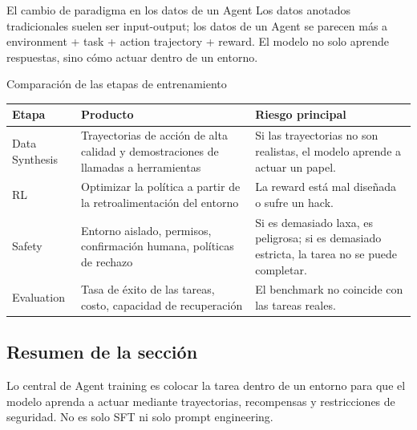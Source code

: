 \begin{importantbox}{El cambio de paradigma en los datos de un Agent}
Los datos anotados tradicionales suelen ser input-output; los datos de un Agent se parecen más a environment + task + action trajectory + reward. El modelo no solo aprende respuestas, sino cómo actuar dentro de un entorno.
\end{importantbox}

\begin{knowledgebox}{Comparación de las etapas de entrenamiento}
\begin{tabularx}{\textwidth}{p{}p{}X}
\toprule
Etapa & Producto & Riesgo principal \\
\midrule
Data Synthesis & Trayectorias de acción de alta calidad y demostraciones de llamadas a herramientas & Si las trayectorias no son realistas, el modelo aprende a actuar un papel. \\
RL & Optimizar la política a partir de la retroalimentación del entorno & La reward está mal diseñada o sufre un hack. \\
Safety & Entorno aislado, permisos, confirmación humana, políticas de rechazo & Si es demasiado laxa, es peligrosa; si es demasiado estricta, la tarea no se puede completar. \\
Evaluation & Tasa de éxito de las tareas, costo, capacidad de recuperación & El benchmark no coincide con las tareas reales. \\
\bottomrule
\end{tabularx}
\end{knowledgebox}

\subsection{Resumen de la sección}

Lo central de Agent training es colocar la tarea dentro de un entorno para que el modelo aprenda a actuar mediante trayectorias, recompensas y restricciones de seguridad. No es solo SFT ni solo prompt engineering.
